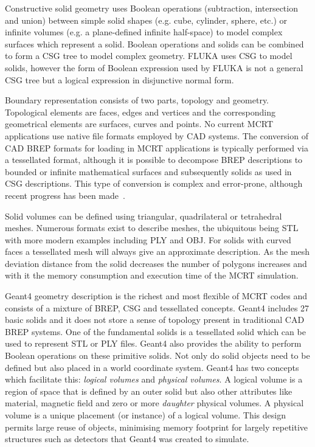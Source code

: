 \documentclass[final,5p,times,twocolumn]{elsarticle}
\begin{document}
Constructive solid geometry uses Boolean operations (subtraction, intersection and union) between simple solid shapes (e.g. cube, cylinder, sphere, etc.) or infinite
volumes (e.g. a plane-defined infinite half-space) to model complex surfaces which represent a solid. Boolean operations and solids can be combined to form a
CSG tree to model complex geometry. FLUKA uses CSG to model solids, however the form of Boolean expression used by FLUKA is not a general CSG tree but a
logical expression in disjunctive normal form.

Boundary representation consists of two parts, topology and geometry. Topological elements are faces, edges and vertices and the corresponding
geometrical elements are surfaces, curves and points. No current MCRT applications use native file formats employed by CAD systems. The conversion of
CAD BREP formats for loading in MCRT applications is typically performed via a tessellated format, although it is possible to decompose BREP descriptions
 to bounded or infinite mathematical surfaces and subsequently solids as used in CSG descriptions. This type of conversion is complex and error-prone,
 although recent progress has been made~\cite{WangNuclSciTech31-82-2020}.

Solid volumes can be defined using triangular, quadrilateral or tetrahedral meshes. Numerous formats exist to describe meshes, the ubiquitous being STL with
more modern examples including PLY and OBJ. For solids with curved faces a tessellated mesh will always give an approximate description. As the mesh
deviation distance from the solid decreases the number of polygons increases and with it the memory consumption and execution time of the MCRT simulation.

Geant4 geometry description is the richest and most flexible of MCRT codes
and consists of a mixture of BREP, CSG and tessellated concepts. Geant4
includes 27 basic solids and it does not store a sense of topology
present in traditional CAD BREP systems. One of the fundamental solids is a
tessellated solid which can be used to represent STL or PLY files.  Geant4
also provides the ability to perform Boolean operations on these primitive
solids. Not only do solid objects need to be defined but also placed in a
world coordinate system. Geant4 has two concepts which facilitate this:
\emph{logical volumes} and \emph{physical volumes}. A logical volume is a
region of space that is defined by an outer solid but also other attributes
like material, magnetic field and zero or more \emph{daughter} physical
volumes. A physical volume is a unique placement (or instance) of a logical
volume. This design permits large reuse of objects, minimising memory
footprint for largely repetitive structures such as detectors that Geant4
was created to simulate.
\end{document}
